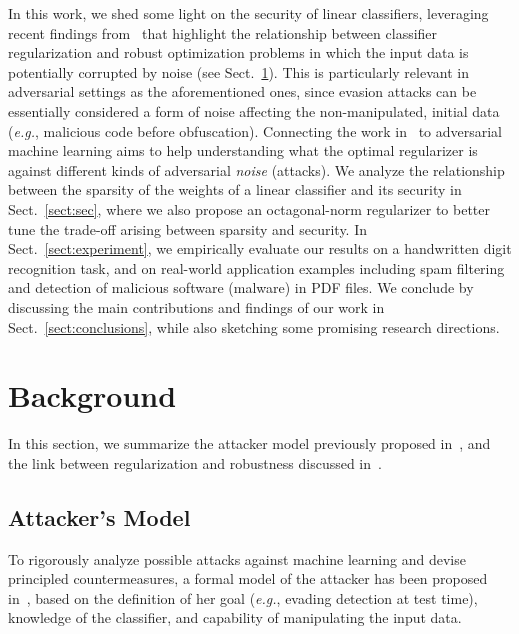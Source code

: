 \documentclass[runningheads,a4paper]{llncs}
\newcommand{\eg}{\emph{e.g.}}
\begin{document}
In this work, we shed some light on the security of linear classifiers, leveraging recent findings from~\cite{xu09,sra11,livni12} that highlight the relationship between classifier regularization and robust optimization problems in which the input data is potentially corrupted by noise (see Sect.~\ref{sect:background}).
This is particularly relevant in adversarial settings as the aforementioned ones, since evasion attacks can be essentially considered a form of noise affecting the non-manipulated, initial data (\eg, malicious code before obfuscation).
Connecting the work in~\cite{xu09,sra11,livni12} to adversarial machine learning aims to
help understanding what the optimal regularizer is against different kinds of adversarial \emph{noise} (attacks). We analyze the relationship between the sparsity of the weights of a linear classifier and its security in Sect.~\ref{sect:sec}, where we also propose an octagonal-norm regularizer to better tune the trade-off arising between sparsity and security.
In Sect.~\ref{sect:experiment}, we empirically evaluate our results on a handwritten digit recognition task, 
and on real-world application examples including spam filtering and detection of malicious software (malware) in PDF files. 
We conclude by discussing the main contributions and findings of our work in Sect.~\ref{sect:conclusions}, while also sketching some promising research directions. 

\section{Background}
\label{sect:background}

In this section, we summarize the attacker model previously proposed in~\cite{biggio13-ecml,biggio14-tkde,biggio14-ijprai,huang11}, and the link between regularization and robustness discussed in~\cite{xu09,sra11,livni12}.

\subsection{Attacker's Model}

To rigorously analyze possible attacks against machine learning and devise principled countermeasures, a formal model of the attacker has been proposed in~\cite{barreno06-asiaccs,biggio13-ecml,biggio14-tkde,biggio14-ijprai,huang11}, based on the definition of her goal (\eg, evading detection at test time), knowledge of the classifier, and capability of manipulating the input data.
\end{document}
